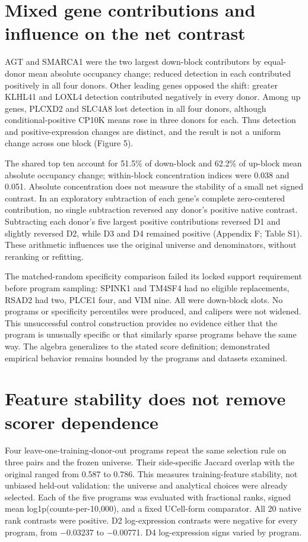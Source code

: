 \documentclass[11pt,letterpaper]{article}
\begin{document}
\section*{Mixed gene contributions and influence on the net contrast}
AGT and SMARCA1 were the two largest down-block contributors by equal-donor mean absolute occupancy change; reduced detection in each contributed positively in all four donors. Other leading genes opposed the shift: greater KLHL41 and LOXL4 detection contributed negatively in every donor. Among up genes, PLCXD2 and SLC4A8 lost detection in all four donors, although conditional-positive CP10K means rose in three donors for each. Thus detection and positive-expression changes are distinct, and the result is not a uniform change across one block (Figure 5).

The shared top ten account for 51.5\% of down-block and 62.2\% of up-block mean absolute occupancy change; within-block concentration indices were 0.038 and 0.051. Absolute concentration does not measure the stability of a small net signed contrast. In an exploratory subtraction of each gene’s complete zero-centered contribution, no single subtraction reversed any donor’s positive native contrast. Subtracting each donor’s five largest positive contributions reversed D1 and slightly reversed D2, while D3 and D4 remained positive (Appendix F; Table S1). These arithmetic influences use the original universe and denominators, without reranking or refitting.

The matched-random specificity comparison failed its locked support requirement before program sampling: SPINK1 and TM4SF4 had no eligible replacements, RSAD2 had two, PLCE1 four, and VIM nine. All were down-block slots. No programs or specificity percentiles were produced, and calipers were not widened. This unsuccessful control construction provides no evidence either that the program is unusually specific or that similarly sparse programs behave the same way. The algebra generalizes to the stated score definition; demonstrated empirical behavior remains bounded by the programs and datasets examined.

\section*{Feature stability does not remove scorer dependence}
Four leave-one-training-donor-out programs repeat the same selection rule on three pairs and the frozen universe. Their side-specific Jaccard overlap with the original ranged from 0.587 to 0.786. This measures training-feature stability, not unbiased held-out validation: the universe and analytical choices were already selected. Each of the five programs was evaluated with fractional ranks, signed mean log1p(counts-per-10,000), and a fixed UCell-form comparator. All 20 native rank contrasts were positive. D2 log-expression contrasts were negative for every program, from −0.03237 to −0.00771. D4 log-expression signs varied by program.
\end{document}
